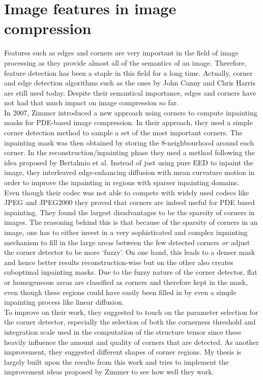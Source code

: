 \section{Image features in image compression}
Features such as edges and corners are very important in the field of image processing as they
provide almost all of the semantics of an image\cite{marr82}. Therefore, feature detection has been a staple in
this field for a long time. Actually, corner and edge detection algorithms such as the ones by John Canny
and Chris Harris\cite{harris88, canny86} are still used today. 
Despite their semantical importance, edges and corners have not had that much impact on image
compression so far.\\

In 2007, Zimmer introduced a new approach using corners to compute inpainting masks for
PDE-based image compression\cite{zimmer07}. In their approach, they used a simple corner detection method to
sample a set of the most important corners. The inpainting mask was then obtained by storing the
8-neighbourhood around each corner. In the reconstruction/inpainting phase they used a method
following the idea proposed by Bertalmio et al\cite{bertalmio00}. Instead of just using pure EED to
inpaint the image, they interleaved edge-enhancing diffusion with mean curvature motion in order to
improve the inpainting in regions with sparser inpainting domains. \\
Even though their codec was
not able to compete with widely used codecs like JPEG and JPEG2000 they proved that corners are
indeed useful for PDE based inpainting. They found the largest disadvantages to be the sparsity of
corners in images. The reasoning behind this is that because of the sparsity of corners in an
image, one has to either invest in a very sophisticated and complex inpainting mechanism to fill in
the large areas between the few detected corners \textit{or} adjust the corner detector to be more
`fuzzy'. On one hand, this leads to a denser mask and hence better results reconstruction-wise 
but on the other also creates suboptimal inpainting masks. Due to the fuzzy nature of the
corner detector, flat or homogeneous areas are classified as corners and therefore kept in the
mask, even though these regions could have easily been filled in by even a simple inpainting
process like linear diffusion. \\
To improve on their work, they suggested to touch on the parameter
selection for the corner detector, especially the selection of both the cornerness threshold and
integration scale used in the computation of the structure tensor since these heavily influence the
amount and quality of corners that are detected. As another improvement, they suggested different
shapes of corner regions. My thesis is largely built upon the results from this work and tries to
implement the improvement ideas proposed by Zimmer to see how well they work.\\

